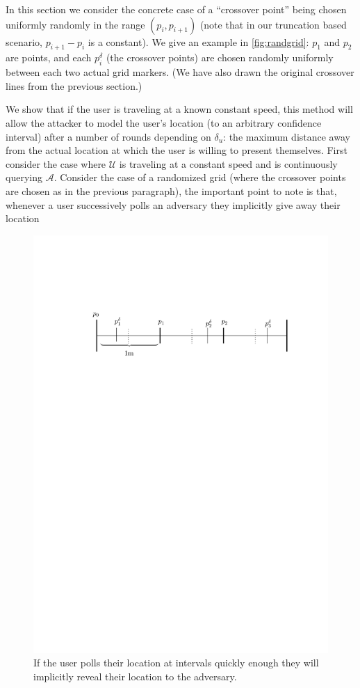 \documentclass{article}
\begin{document}
In this section we consider the concrete case of a ``crossover point''
being chosen uniformly randomly in the range $(p_i,p_{i+1})$ (note
that in our truncation based scenario, $p_{i+1} - p_i$ is a constant).
We give an example in \ref{fig:randgrid}: $p_1$ and $p_2$ are points,
and each $p_i^{\delta}$ (the crossover points) are chosen randomly
uniformly between each two actual grid markers.  (We have also drawn
the original crossover lines from the previous section.)

We show that if the user is traveling at a known constant speed, this
method will allow the attacker to model the user's location (to an
arbitrary confidence interval) after a number of rounds depending on
$\delta_u$: the maximum distance away from the actual location at
which the user is willing to present themselves.  First consider the
case where $\mathcal{U}$ is traveling at a constant speed and is
continuously querying $\mathcal{A}$.  Consider the case of a
randomized grid (where the crossover points are chosen as in the
previous paragraph), the important point to note is that, whenever a
user successively polls an adversary they implicitly give away their
location 

\begin{figure}[h]
  \label{fig:interarrival}
  \includegraphics[width=\textwidth]{threat_model_diagram_randomized_truncation.pdf}
  \caption{If the user polls their location at intervals quickly
    enough they will implicitly reveal their location to the
    adversary.}
\end{figure}
\end{document}

